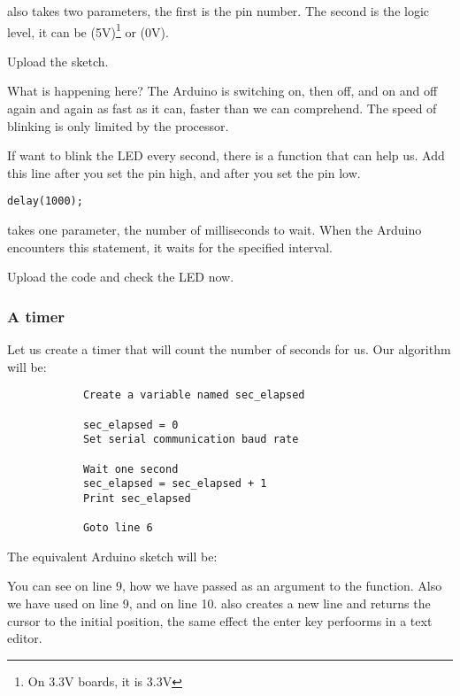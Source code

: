 \documentclass{article}
\begin{document}
			 also takes two parameters, the first is the pin number. The second is the logic level, it can be  (5V)\footnote{On 3.3V boards, it is 3.3V} or  (0V).

			Upload the sketch.

			What is happening here? The Arduino is switching on, then off, and on and off again and again as fast as it can, faster than we can comprehend. The speed of blinking is only limited by the processor.

			If want to blink the LED every second, there is a function  that can help us. Add this line after you set the pin high, and after you set the pin low.

			\begin{lstlisting}[numbers = none]
			delay(1000);
			\end{lstlisting}

			 takes one parameter, the number of milliseconds to wait. When the Arduino encounters this statement, it waits for the specified interval. 

			Upload the code and check the LED now.

		\subsubsection{A timer}

			Let us create a timer that will count the number of seconds for us. Our algorithm will be:

			\begin{lstlisting}
			Create a variable named sec_elapsed

			sec_elapsed = 0
			Set serial communication baud rate

			Wait one second
			sec_elapsed = sec_elapsed + 1
			Print sec_elapsed

			Goto line 6
			\end{lstlisting}

			The equivalent Arduino sketch will be:

			

			You can see on line 9, how we have passed  as an argument to the  function. Also we have used  on line 9, and  on line 10.  also creates a new line and returns the cursor to the initial position, the same effect the enter key perfoorms in a text editor.
\end{document}
